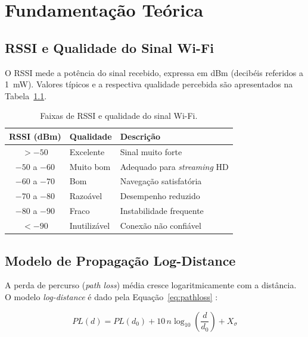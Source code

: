 \documentclass[
  12pt,
  a4paper,
  oneside,
  brazil,
  chapter=TITLE,
  section=TITLE,
]{abntex2}
\begin{document}
\chapter{Fundamenta\c{c}\~ao Te\'orica}

\section{RSSI e Qualidade do Sinal Wi-Fi}

O RSSI mede a pot\^encia do sinal recebido, expressa em dBm (decib\'eis
referidos a \SI{1}{\milli\watt}). Valores t\'ipicos e a respectiva qualidade
percebida s\~ao apresentados na Tabela~\ref{tab:rssi_qualidade}.

\begin{table}[ht]
  \centering
  \caption{Faixas de RSSI e qualidade do sinal Wi-Fi.}
  \label{tab:rssi_qualidade}
  \begin{tabular}{cll}
    \toprule
    \textbf{RSSI (dBm)} & \textbf{Qualidade} & \textbf{Descri\c{c}\~ao} \\
    \midrule
    $> -50$         & Excelente    & Sinal muito forte \\
    $-50$ a $-60$   & Muito bom    & Adequado para \textit{streaming} HD \\
    $-60$ a $-70$   & Bom          & Navega\c{c}\~ao satisfat\'oria \\
    $-70$ a $-80$   & Razo\'avel    & Desempenho reduzido \\
    $-80$ a $-90$   & Fraco        & Instabilidade frequente \\
    $< -90$         & Inutiliz\'avel & Conex\~ao n\~ao confi\'avel \\
    \bottomrule
  \end{tabular}
\end{table}

\section{Modelo de Propaga\c{c}\~ao Log-Distance}

A perda de percurso (\textit{path loss}) m\'edia cresce logaritmicamente com a
dist\^ancia. O modelo \textit{log-distance} \'e dado pela
Equa\c{c}\~ao~\ref{eq:pathloss} \cite{rappaport2002,goldsmith2005}:

\begin{equation}
  PL(d) = PL(d_0) + 10\,n\log_{10}\!\left(\frac{d}{d_0}\right) + X_\sigma
  \label{eq:pathloss}
\end{equation}
\end{document}
